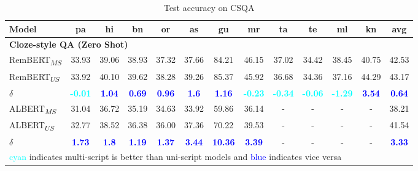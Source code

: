 \documentclass[11pt]{article}
\begin{document}
\begin{table*}[hbt!]
\begin{center}
\begin{adjustbox}{max width=0.8\textwidth}
\small
\begin{tabular}{l c c c c c c c c c c c c}
\toprule[2pt]
\textbf{Model} & \textbf{pa} & \textbf{hi} & \textbf{bn} & \textbf{or} & \textbf{as} & \textbf{gu} & \textbf{mr} & \textbf{ta} & \textbf{te} & \textbf{ml} & \textbf{kn} & \textbf{avg}\\ 
\midrule[2pt]
\multicolumn{13}{l}{\textbf{Cloze-style QA (Zero Shot)}}\\
RemBERT\textsubscript{$MS$}  & 33.93 & 39.06 & 38.93 & 37.32 & 37.66 & 84.21 & 46.15 & 37.02 & 34.42 & 38.45 & 40.75 & 42.53 \\
RemBERT\textsubscript{$US$}  & 33.92 & 40.10 & 39.62 & 38.28 & 39.26 & 85.37 & 45.92 & 36.68 & 34.36 & 37.16 & 44.29 & 43.17 \\
$\delta$ & \textcolor{cyan}{\textbf{-0.01}} & \textcolor{blue}{\textbf{1.04}} & \textcolor{blue}{\textbf{0.69}} & \textcolor{blue}{\textbf{0.96}} & \textcolor{blue}{\textbf{1.6}} & \textcolor{blue}{\textbf{1.16}} & \textcolor{cyan}{\textbf{-0.23}} & \textcolor{cyan}{\textbf{-0.34}} & \textcolor{cyan}{\textbf{-0.06}} & \textcolor{cyan}{\textbf{-1.29}} & \textcolor{blue}{\textbf{3.54}} & \textcolor{blue}{\textbf{0.64}} \\
\midrule[1pt]
ALBERT\textsubscript{$MS$}           & 31.04    & 36.72  & 35.19  & 34.63  & 33.92  & 59.86  & 36.14 & - & - & - & - & 38.21  \\
ALBERT\textsubscript{$US$}  &  32.77& 38.52& 36.38& 36.00& 37.36& 70.22& 39.53& - & - & - & - & 41.54  \\
$\delta$ & \textcolor{blue}{\textbf{1.73}} & \textcolor{blue}{\textbf{1.8}} & \textcolor{blue}{\textbf{1.19}} & \textcolor{blue}{\textbf{1.37}} & \textcolor{blue}{\textbf{3.44}} & \textcolor{blue}{\textbf{10.36}} & \textcolor{blue}{\textbf{3.39}} & - & - & - & - & \textcolor{blue}{\textbf{3.33}}  \\
\bottomrule[2pt]
\multicolumn{13}{l}{\textcolor{cyan}{cyan} indicates multi-script is better than uni-script models and \textcolor{blue}{blue} indicates vice versa}
\end{tabular}
\end{adjustbox}
\caption{Test accuracy on CSQA}
\label{table-res-csqa}
\end{center}
\end{table*}
\end{document}
